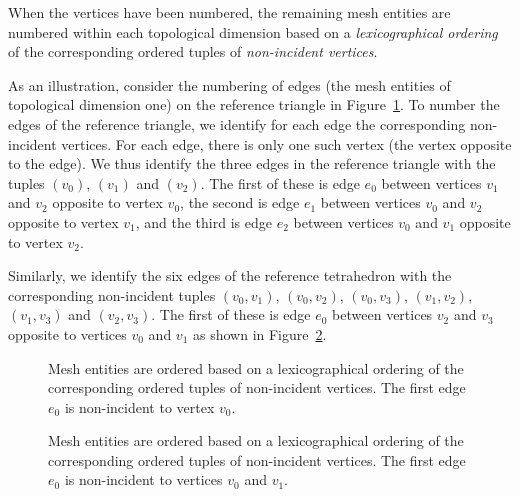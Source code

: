 When the vertices have been numbered, the remaining mesh entities are
numbered within each topological dimension based on a
\emph{lexicographical ordering} of the corresponding ordered tuples of
\emph{non-incident vertices}.

As an illustration, consider the numbering of edges (the mesh entities
of topological dimension one) on the reference triangle in
Figure~\ref{fig:orderingexample,triangle}. To number the edges of the
reference triangle, we identify for each edge the corresponding
non-incident vertices. For each edge, there is only one such vertex
(the vertex opposite to the edge). We thus identify the three edges in
the reference triangle with the tuples $(v_0)$, $(v_1)$ and $(v_2)$. The
first of these is edge $e_0$ between vertices $v_1$ and $v_2$ opposite
to vertex $v_0$, the second is edge $e_1$ between vertices $v_0$ and
$v_2$ opposite to vertex $v_1$, and the third is edge $e_2$ between
vertices $v_0$ and $v_1$ opposite to vertex $v_2$.

Similarly, we identify the six edges of the reference tetrahedron with
the corresponding non-incident tuples $(v_0, v_1)$, $(v_0, v_2)$,
$(v_0, v_3)$, $(v_1, v_2)$, $(v_1, v_3)$ and $(v_2, v_3)$. The first of these is
edge $e_0$ between vertices $v_2$ and $v_3$ opposite to vertices $v_0$
and $v_1$ as shown in Figure~\ref{fig:orderingexample,tetrahedron}.

\begin{figure}[htbp]
  \begin{center}
    \caption{Mesh entities are ordered based on a lexicographical ordering
      of the corresponding ordered tuples of non-incident vertices.
      The first edge $e_0$ is non-incident to vertex $v_0$.}
    \label{fig:orderingexample,triangle}
  \end{center}
\end{figure}

\begin{figure}[htbp]
  \begin{center}
    \caption{Mesh entities are ordered based on a lexicographical ordering
      of the corresponding ordered tuples of non-incident vertices.
      The first edge $e_0$ is non-incident to vertices $v_0$ and $v_1$.}
    \label{fig:orderingexample,tetrahedron}
  \end{center}
\end{figure}

